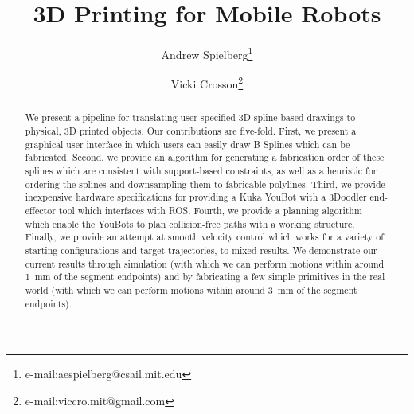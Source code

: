 \documentclass[conference]{acmsiggraph}
\title{3D Printing for Mobile Robots}
\author{Andrew Spielberg\thanks{e-mail:aespielberg@csail.mit.edu} \and Vicki Crosson\thanks{e-mail:viccro.mit@gmail.com}}
\begin{document}


\maketitle

\begin{abstract}
We present a pipeline for translating user-specified 3D spline-based drawings to physical, 3D printed objects.  Our contributions are five-fold.  First, we present a graphical user interface in which users can easily draw B-Splines which can be fabricated.  Second, we provide an algorithm for generating a fabrication order of these splines which are consistent with support-based constraints, as well as a heuristic for ordering the splines and downsampling them to fabricable polylines.  Third, we provide inexpensive hardware specifications for providing a Kuka YouBot with a 3Doodler end-effector tool which interfaces with ROS.  Fourth, we provide a planning algorithm which enable the YouBots to plan collision-free paths with a working structure.  Finally, we provide an attempt at smooth velocity control which works for a variety of starting configurations and target trajectories, to mixed results.  We demonstrate our current results through simulation (with which we can perform motions within around 1~mm of the segment endpoints) and by fabricating a few simple primitives in the real world (with which we can perform motions within around 3~mm of the segment endpoints).




\end{abstract}
\end{document}
